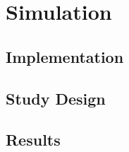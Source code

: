 \section{Simulation}


\subsection{Implementation}


\subsection{Study Design}


\subsection{Results}
